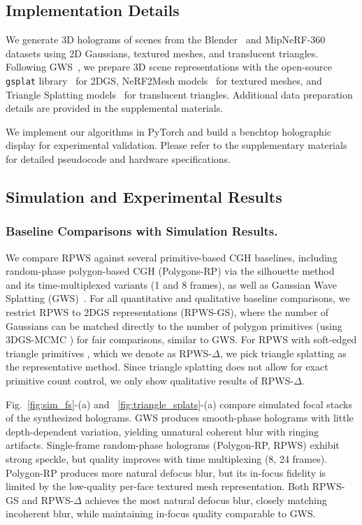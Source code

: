 \subsection{Implementation Details}
We generate 3D holograms of scenes from the Blender~\cite{mildenhall2020nerf} and MipNeRF-360~\cite{barron2022mipnerf360} datasets using 2D Gaussians, textured meshes, and translucent triangles. Following GWS~\cite{choi2025gaussian}, we prepare 3D scene representations with the open-source \texttt{gsplat} library~\cite{ye2024gsplat} for 2DGS, NeRF2Mesh models~\cite{tang2022nerf2mesh} for textured meshes, and Triangle Splatting models~\cite{Held2025Triangle} for translucent triangles. Additional data preparation details are provided in the supplemental materials.

We implement our algorithms in PyTorch and build a benchtop holographic display for experimental validation. Please refer to the supplementary materials for detailed pseudocode and hardware specifications.

\subsection{Simulation and Experimental Results}
\label{subsec:results}
\subsubsection{Baseline Comparisons with Simulation Results. }

We compare RPWS against several primitive-based CGH baselines, including random-phase polygon-based CGH (Polygons-RP) via the silhouette method~\cite{matsushima2003fast, matsushima2005exact, matsushima2009extremely} and its time-multiplexed variants (1 and 8 frames), as well as Gaussian Wave Splatting (GWS)~\cite{choi2025gaussian}. For all quantitative and qualitative baseline comparisons, we restrict RPWS to 2DGS representations (RPWS-GS), where the number of Gaussians can be matched directly to the number of polygon primitives (using 3DGS-MCMC \cite{kheradmand20243dgsmcmc}) for fair comparisons, similar to GWS. For RPWS with soft-edged triangle primitives \cite{burgdorfer2025radianttrianglesoupsoft, Held2025Triangle, sheng20252dtrianglesplattingdirect}, which we denote as RPWS-$\Delta$, we pick triangle splatting \cite{Held2025Triangle} as the representative method. Since triangle splatting does not allow for exact primitive count control, we only show qualitative results of RPWS-$\Delta$.


Fig.~\ref{fig:sim_fs}-(a) and ~\ref{fig:triangle_splats}-(a) compare simulated focal stacks of the synthesized holograms. GWS produces smooth-phase holograms with little depth-dependent variation, yielding unnatural coherent blur with ringing artifacts. Single-frame random-phase holograms (Polygon-RP, RPWS) exhibit strong speckle, but quality improves with time multiplexing (8, 24 frames). Polygon-RP produces more natural defocus blur, but its in-focus fidelity is limited by the low-quality per-face textured mesh representation. Both RPWS-GS and RPWS-$\Delta$ achieves the most natural defocus blur, closely matching incoherent blur, while maintaining in-focus quality comparable to GWS.


